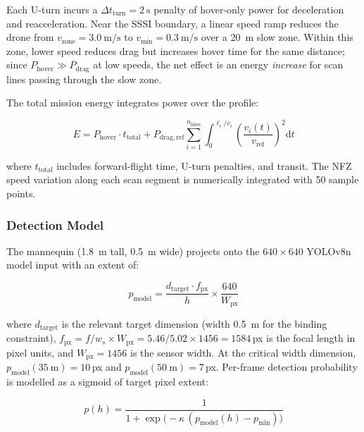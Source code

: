 Each U-turn incurs a $\Delta t_{\mathrm{turn}} = \SI{2}{\second}$ penalty of hover-only power for deceleration and reacceleration.
Near the SSSI boundary, a linear speed ramp reduces the drone from $v_{\mathrm{zone}} = \SI{3.0}{\metre\per\second}$ to $v_{\mathrm{min}} = \SI{0.3}{\metre\per\second}$ over a \SI{20}{\metre} slow zone.
Within this zone, lower speed reduces drag but increases hover time for the same distance; since $P_{\mathrm{hover}} \gg P_{\mathrm{drag}}$ at low speeds, the net effect is an energy \emph{increase} for scan lines passing through the slow zone.

The total mission energy integrates power over the profile:

\begin{equation}\label{eq:opt-energy}
  E = P_{\mathrm{hover}} \cdot t_{\mathrm{total}} + P_{\mathrm{drag,ref}} \sum_{i=1}^{n_{\mathrm{lines}}} \int_0^{\ell_i / v_i} \!\left(\frac{v_i(t)}{v_{\mathrm{ref}}}\right)^{\!2} \mathrm{d}t
\end{equation}

\noindent where $t_{\mathrm{total}}$ includes forward-flight time, U-turn penalties, and transit.
The NFZ speed variation along each scan segment is numerically integrated with 50 sample points.

\subsubsection{Detection Model}

The mannequin (\SI{1.8}{\metre} tall, \SI{0.5}{\metre} wide) projects onto the $640 \times 640$ YOLOv8n model input with an extent of:

\begin{equation}\label{eq:opt-modelpx}
  p_{\mathrm{model}} = \frac{d_{\mathrm{target}} \cdot f_{\mathrm{px}}}{h} \times \frac{640}{W_{\mathrm{px}}}
\end{equation}

\noindent where $d_{\mathrm{target}}$ is the relevant target dimension (width \SI{0.5}{\metre} for the binding constraint), $f_{\mathrm{px}} = f/w_s \times W_{\mathrm{px}} = 5.46/5.02 \times 1456 = 1584$\,px is the focal length in pixel units, and $W_{\mathrm{px}} = 1456$ is the sensor width.
At the critical width dimension, $p_{\mathrm{model}}(\SI{35}{\metre}) = 10$\,px and $p_{\mathrm{model}}(\SI{50}{\metre}) = 7$\,px.
Per-frame detection probability is modelled as a sigmoid of target pixel extent:

\begin{equation}\label{eq:opt-psingle}
  p(h) = \frac{1}{1 + \exp\!\bigl(-\kappa\,(p_{\mathrm{model}}(h) - p_{\mathrm{min}})\bigr)}
\end{equation}

